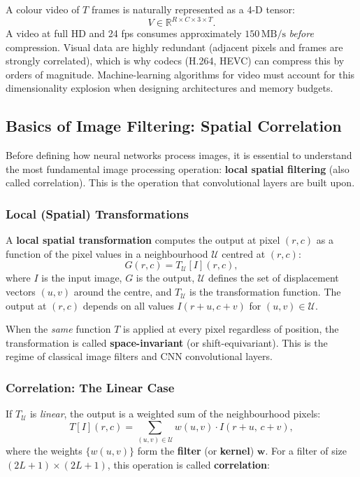 \documentclass[11pt,a4paper]{article}
\begin{document}
A colour video of $T$ frames is naturally represented as a 4-D tensor:
\[
  V \in \mathbb{R}^{R \times C \times 3 \times T}.
\]
A video at full HD and 24 fps consumes approximately $150\,\mathrm{MB/s}$ \emph{before}
compression.  Visual data are highly redundant (adjacent pixels and frames are strongly correlated),
which is why codecs (H.264, HEVC) can compress this by orders of magnitude.  Machine-learning
algorithms for video must account for this dimensionality explosion when designing architectures
and memory budgets.

\subsection{Basics of Image Filtering: Spatial Correlation}
\label{sec:spatial_correlation}

Before defining how neural networks process images, it is essential to understand the most
fundamental image processing operation: \textbf{local spatial filtering} (also called correlation).
This is the operation that convolutional layers are built upon.

\subsubsection{Local (Spatial) Transformations}

A \textbf{local spatial transformation} computes the output at pixel $(r, c)$ as a function of the
pixel values in a neighbourhood $\mathcal{U}$ centred at $(r, c)$:
\[
  G(r, c) = T_{\mathcal{U}}[I](r, c),
\]
where $I$ is the input image, $G$ is the output, $\mathcal{U}$ defines the set of displacement
vectors $(u, v)$ around the centre, and $T_{\mathcal{U}}$ is the transformation function.
The output at $(r,c)$ depends on all values $I(r+u, c+v)$ for $(u,v) \in \mathcal{U}$.

When the \emph{same} function $T$ is applied at every pixel regardless of position, the
transformation is called \textbf{space-invariant} (or shift-equivariant).  This is the regime
of classical image filters and CNN convolutional layers.

\subsubsection{Correlation: The Linear Case}

If $T_{\mathcal{U}}$ is \emph{linear}, the output is a weighted sum of the neighbourhood pixels:
\[
  T[I](r, c) = \sum_{(u,v) \in \mathcal{U}} w(u, v)\cdot I(r + u,\, c + v),
\]
where the weights $\{w(u,v)\}$ form the \textbf{filter} (or \textbf{kernel}) $\mathbf{w}$.
For a filter of size $(2L+1) \times (2L+1)$, this operation is called \textbf{correlation}:
\end{document}
